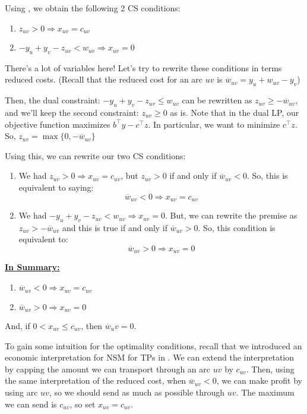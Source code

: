 Using , we obtain the following 2 CS conditions:
\begin{enumerate}
    \item $z_{uv} > 0 \Rightarrow x_{uv} = c_{uv}$
    \item $-y_u + y_v - z_{uv} < w_{uv} \Rightarrow x_{uv} = 0$
\end{enumerate}

There's a lot of variables here!
Let's try to rewrite these conditions in terms reduced costs. (Recall that the reduced cost for an arc $uv$ is $\overline{w}_{uv} = y_u + w_{uv} - y_v$)

Then, the dual constraint: $-y_u + y_v - z_{uv} \leq w_{uv}$ can be rewritten as $z_{uv} \geq -\overline{w}_{uv}$, and we'll keep the second constraint: $z_{uv} \geq 0$ as is.
Note that in the dual LP, our objective function maximizes $b^\intercal y - c^\intercal z$.
In particular, we want to minimize $c^\intercal z$.
So, $z_{uv} = \max\{0, -\overline{w}_{uv}\}$

Using this, we can rewrite our two CS conditions:
\begin{enumerate}
    \item We had $z_{uv} > 0 \Rightarrow x_{uv} = c_{uv}$, but $z_{uv} > 0$ if and only if $\overline{w}_{uv} < 0$. So, this is equivalent to saying:
    \begin{equation*}
        \overline{w}_{uv} < 0 \Rightarrow x_{uv} = c_{uv}
    \end{equation*}

    \item We had $-y_u + y_v - z_{uv} < w_{uv} \Rightarrow x_{uv} = 0$. But, we can rewrite the premise as $z_{uv} > -\overline{w}_{uv}$ and this is true if and only if $\overline{w}_{uv} > 0$. So, this condition is equivalent to:
    \begin{equation*}
        \overline{w}_{uv} > 0 \Rightarrow x_{uv} = 0
    \end{equation*} 
\end{enumerate}

\underline{\textbf{In Summary:}}
\begin{enumerate}
    \item $\overline{w}_{uv} < 0 \Rightarrow x_{uv} = c_{uv}$
    \item $\overline{w}_{uv} > 0 \Rightarrow x_{uv} = 0$
\end{enumerate}
And, if $0 < x_{uv} \leq c_{uv}$, then $\overline{w}_uv = 0$.

To gain some intuition for the optimality conditions, recall that we introduced an economic interpretation for NSM for TPs in . 
We can extend the interpretation by capping the amount we can transport through an arc $uv$ by $c_{uv}$.
Then, using the same interpretation of the reduced cost, when $\overline{w}_{uv} < 0$, we can make profit by using arc $uv$, so we should send as much as possible through $uv$.
The maximum we can send is $c_{uv}$, so set $x_{uv} = c_{uv}$.

